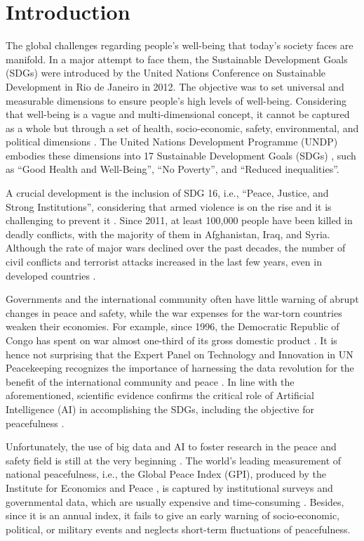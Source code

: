 \documentclass{bmcart}
\begin{document}
\section{Introduction}
The global challenges regarding people's well-being that today's society faces are manifold. In a major attempt to face them, the Sustainable Development Goals (SDGs) were introduced by the United Nations Conference on Sustainable Development in Rio de Janeiro in 2012.
The objective was to set universal and measurable dimensions to ensure people's high levels of well-being. Considering that well-being is a vague and multi-dimensional concept, it cannot be captured as a whole but through a set of health, socio-economic, safety, environmental, and political dimensions \cite{organisation2011s, voukelatou2020measuring}. 
The United Nations Development Programme (UNDP) embodies these dimensions into 17 Sustainable Development Goals (SDGs) \cite{unSDGs, kroll2019sustainable, le2015towards}, such as ``Good Health and Well-Being'', ``No Poverty'', and ``Reduced inequalities''. 

A crucial development is the inclusion of SDG 16, i.e., ``Peace, Justice, and Strong Institutions'', considering that armed violence is on the rise and it is challenging to prevent it \cite{world2018pathways}. 
Since 2011, at least 100,000 people have been killed in deadly conflicts, with the majority of them in Afghanistan, Iraq, and Syria. 
Although the rate of major wars declined over the past decades, the number of civil conflicts and terrorist attacks increased in the last few years, even in developed countries \cite{guo2018retool}.

Governments and the international community often have little warning of abrupt changes in peace and safety, while the war expenses for the war-torn countries weaken their economies. 
For example, since 1996, the Democratic Republic of Congo has spent on war almost one-third of its gross domestic product \cite{hillier2007africa}. 
It is hence not surprising that the Expert Panel on Technology and Innovation in UN Peacekeeping recognizes the importance of harnessing the data revolution for the benefit of the international community and peace \cite{perera2017boldly}. 
In line with the aforementioned, scientific evidence confirms the critical role of Artificial Intelligence (AI) in accomplishing the SDGs, including the objective for peacefulness \cite{vinuesa2020role}.

Unfortunately, the use of big data and AI to foster research in the peace and safety field is still at the very beginning \cite{wahlisch2020big, guo2018retool}. 
The world's leading measurement of national peacefulness, i.e., the Global Peace Index (GPI), produced by the Institute for Economics and Peace \cite{gpi_report_2020}, is captured by institutional surveys and governmental data, which are usually expensive and time-consuming \cite{voukelatou2020measuring}. 
Besides, since it is an annual index, it fails to give an early warning of socio-economic, political, or military events and neglects short-term fluctuations of peacefulness.
\end{document}
